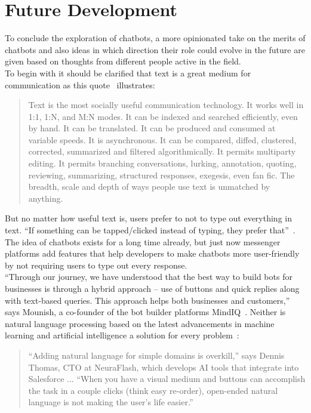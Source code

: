 \chapter{Future Development}

To conclude the exploration of chatbots, a more opinionated take on the merits of chatbots
and also ideas in which direction their role could evolve in the future are given
based on thoughts from different people active in the field.
\\

To begin with it should be clarified that text is a great medium for communication as this quote~\cite{futuretext} illustrates:

\begin{quote}
Text is the most socially useful communication technology. It works well in 1:1, 1:N, and M:N modes. It can be indexed and searched efficiently, even by hand. It can be translated. It can be produced and consumed at variable speeds. It is asynchronous. It can be compared, diffed, clustered, corrected, summarized and filtered algorithmically. It permits multiparty editing. It permits branching conversations, lurking, annotation, quoting, reviewing, summarizing, structured responses, exegesis, even fan fic. The breadth, scale and depth of ways people use text is unmatched by anything.
\end{quote}

But no matter how useful text is, users prefer to not to type out everything in text.
``If something can be tapped/clicked instead of typing, they prefer that''~\cite{chatbotslife}.
\\

The idea of chatbots exists for a long time already,
but just now messenger platforms add features that help developers to make chatbots more user-friendly by not requiring users to type out every response.
\\
``Through our journey, we have understood that the best way to build bots for businesses is through a hybrid approach – use of buttons and quick replies along with text-based queries. This approach helps both businesses and customers,'' says Mounish, a co-founder of the bot builder platforms MindIQ~\cite{techinasia}.
Neither is natural language processing based on the latest advancements in machine learning and artificial intelligence a solution for every problem~\cite{neednlp}:

\begin{quote}
“Adding natural language for simple domains is overkill,” says Dennis Thomas, CTO at NeuraFlash, which develops AI tools that integrate into Salesforce ... “When you have a visual medium and buttons can accomplish the task in a couple clicks (think easy re-order), open-ended natural language is not making the user’s life easier.”
\end{quote}

